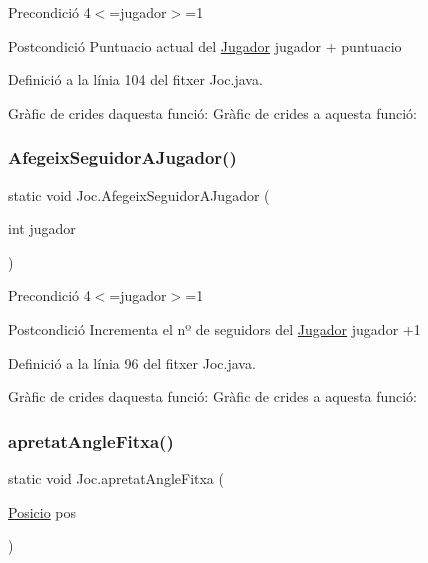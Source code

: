 \begin{DoxyPrecond}{Precondició}
4$<$=jugador$>$=1 
\end{DoxyPrecond}
\begin{DoxyPostcond}{Postcondició}
Puntuacio actual del \mbox{\hyperlink{class_jugador}{Jugador}} jugador + puntuacio 
\end{DoxyPostcond}


Definició a la línia 104 del fitxer Joc.\+java.

Gràfic de crides d\textquotesingle{}aquesta funció\+:
Gràfic de crides a aquesta funció\+:
\mbox{\label{class_joc_a7b2aa3cddde39037414f87df367b3599}} 
\subsubsection{\texorpdfstring{Afegeix\+Seguidor\+A\+Jugador()}{AfegeixSeguidorAJugador()}}
{\footnotesize\ttfamily static void Joc.\+Afegeix\+Seguidor\+A\+Jugador (\begin{DoxyParamCaption}\item[{int}]{jugador }\end{DoxyParamCaption})\hspace{0.3cm}{\ttfamily [static]}}

\begin{DoxyPrecond}{Precondició}
4$<$=jugador$>$=1 
\end{DoxyPrecond}
\begin{DoxyPostcond}{Postcondició}
Incrementa el nº de seguidors del \mbox{\hyperlink{class_jugador}{Jugador}} jugador +1 
\end{DoxyPostcond}


Definició a la línia 96 del fitxer Joc.\+java.

Gràfic de crides d\textquotesingle{}aquesta funció\+:
Gràfic de crides a aquesta funció\+:
\mbox{\label{class_joc_a1a732f8c5fe455e04c76f38259eb00ba}} 
\subsubsection{\texorpdfstring{apretat\+Angle\+Fitxa()}{apretatAngleFitxa()}}
{\footnotesize\ttfamily static void Joc.\+apretat\+Angle\+Fitxa (\begin{DoxyParamCaption}\item[{\mbox{\hyperlink{class_posicio}{Posicio}}}]{pos }\end{DoxyParamCaption})\hspace{0.3cm}{\ttfamily [static]}}

